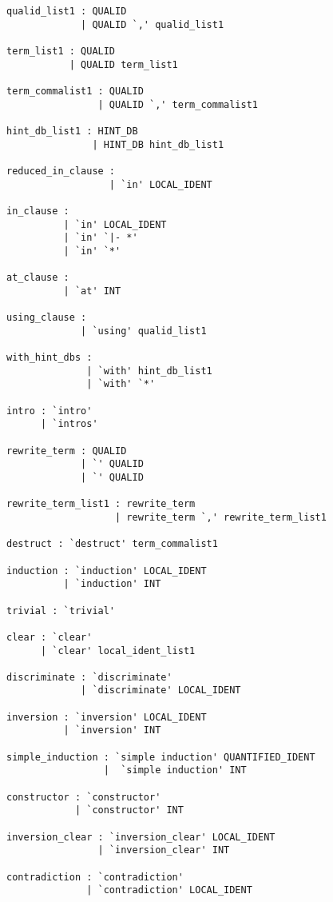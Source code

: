 \documentclass{article}
\begin{document}
\begin{lstlisting}[mathescape]
qualid_list1 : QUALID
             | QUALID `,' qualid_list1

term_list1 : QUALID
           | QUALID term_list1

term_commalist1 : QUALID
                | QUALID `,' term_commalist1

hint_db_list1 : HINT_DB
               | HINT_DB hint_db_list1

reduced_in_clause :
                  | `in' LOCAL_IDENT

in_clause :
          | `in' LOCAL_IDENT
          | `in' `|- *'
          | `in' `*'

at_clause : 
          | `at' INT

using_clause :
             | `using' qualid_list1

with_hint_dbs :
              | `with' hint_db_list1
              | `with' `*'

intro : `intro'
      | `intros'

rewrite_term : QUALID
             | `' QUALID
             | `' QUALID

rewrite_term_list1 : rewrite_term
                   | rewrite_term `,' rewrite_term_list1

destruct : `destruct' term_commalist1

induction : `induction' LOCAL_IDENT
          | `induction' INT

trivial : `trivial' 

clear : `clear'
      | `clear' local_ident_list1

discriminate : `discriminate'
             | `discriminate' LOCAL_IDENT

inversion : `inversion' LOCAL_IDENT
          | `inversion' INT

simple_induction : `simple induction' QUANTIFIED_IDENT
                 |  `simple induction' INT

constructor : `constructor'
            | `constructor' INT

inversion_clear : `inversion_clear' LOCAL_IDENT
                | `inversion_clear' INT

contradiction : `contradiction'
              | `contradiction' LOCAL_IDENT
\end{lstlisting}


\twocolumn





\end{document}
